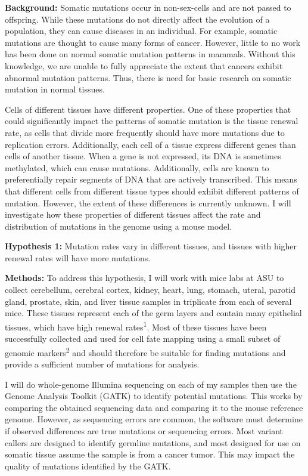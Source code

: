 \documentclass[12pt]{article}
\begin{document}
\noindent
\textbf{Background:}
Somatic mutations occur in non-sex-cells and are not passed to offspring.
While these mutations do not directly affect the evolution of a population, they can cause diseases in an individual.
For example, somatic mutations are thought to cause many forms of cancer.
However, little to no work has been done on normal somatic mutation patterns in mammals.
Without this knowledge, we are unable to fully appreciate the extent that cancers exhibit abnormal mutation patterns.
Thus, there is need for basic research on somatic mutation in normal tissues.

Cells of different tissues have different properties.
One of these properties that could significantly impact the patterns of somatic mutation is the tissue renewal rate, as cells that divide more frequently should have more mutations due to replication errors.
Additionally, each cell of a tissue express different genes than cells of another tissue.
When a gene is not expressed, its DNA is sometimes methylated, which can cause mutations.
Additionally, cells are known to preferentially repair segments of DNA that are actively transcribed.
This means that different cells from different tissue types should exhibit different patterns of mutation.
However, the extent of these differences is currently unknown.
I will investigate how these properties of different tissues affect the rate and distribution of mutations in the genome using a mouse model.

\textbf{Hypothesis 1:}
Mutation rates vary in different tissues, and tissues with higher renewal rates will have more mutations.

\textbf{Methods:}
To address this hypothesis, I will work with mice labs at ASU to collect cerebellum, cerebral cortex, kidney, heart, lung, stomach, uteral, parotid gland, prostate, skin, and liver tissue samples in triplicate from each of several mice.
These tissues represent each of the germ layers and contain many epithelial tissues, which have high renewal rates\textsuperscript{1}.
Most of these tissues have been successfully collected and used for cell fate mapping using a small subset of genomic markers\textsuperscript{2} and should therefore be suitable for finding mutations and provide a sufficient number of mutations for analysis.

I will do whole-genome Illumina sequencing on each of my samples then use the Genome Analysis Toolkit (GATK) to identify potential mutations.
This works by comparing the obtained sequencing data and comparing it to the mouse reference genome.
However, as sequencing errors are common, the software must determine if observed differences are true mutations or sequencing errors.
Most variant callers are designed to identify germline mutations, and most designed for use on somatic tissue assume the sample is from a cancer tumor. This may impact the quality of mutations identified by the GATK.
\end{document}
